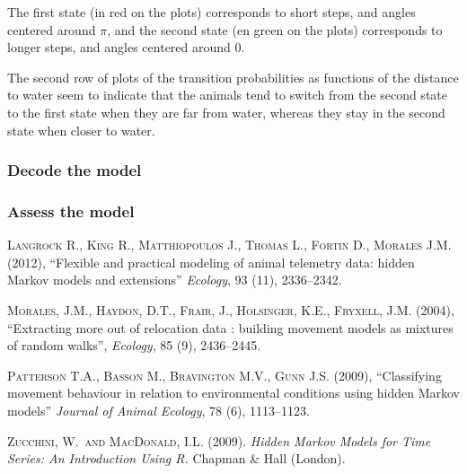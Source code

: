\documentclass[]{article}
\begin{document}
The first state (in red on the plots) corresponds to short steps, and angles centered around $\pi$, and the second state (en green on the plots) corresponds to longer steps, and angles centered around $0$.

The second row of plots of the transition probabilities as functions of the distance to water seem to indicate that the animals tend to switch from the second state to the first state when they are far from water, whereas they stay in the second state when closer to water.

\subsubsection{Decode the model}


\subsubsection{Assess the model}


\begin{thebibliography}{}

\textsc{Langrock R., King R., Matthiopoulos J., Thomas L., Fortin D., Morales J.M.} (2012),
``Flexible and practical modeling of animal telemetry data: hidden Markov models and extensions''
\textit{Ecology}, 93 (11), 2336--2342.

\textsc{Morales, J.M., Haydon, D.T., Frair, J., Holsinger, K.E., Fryxell, J.M.} (2004),
``Extracting more out of relocation data : building movement models as mixtures of random walks'',
\textit{Ecology}, 85 (9), 2436--2445.

\textsc{Patterson T.A., Basson M., Bravington M.V., Gunn J.S.} (2009),
``Classifying movement behaviour in relation to environmental conditions using hidden Markov models''
\textit{Journal of Animal Ecology}, 78 (6), 1113--1123.

\textsc{Zucchini, W.\ and MacDonald, I.L.} (2009).
{\em Hidden Markov Models for Time Series: An Introduction Using R.}
Chapman \& Hall (London).

\end{thebibliography}
\end{document}

